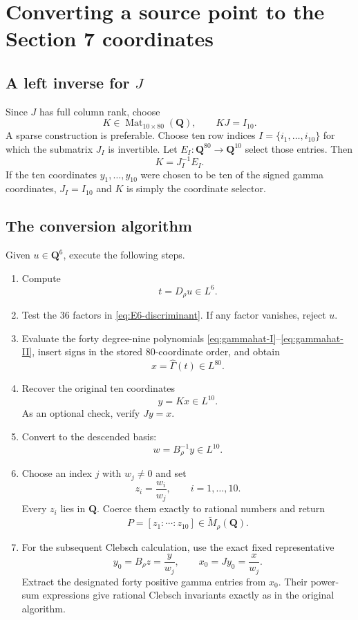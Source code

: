 \documentclass[11pt]{article}
\newcommand{\QQ}{\mathbf{Q}}
\newcommand{\Mat}{\operatorname{Mat}}
\newcommand{\tM}{\widetilde{M}}
\newcommand{\Gamhat}{\widehat{\Gamma}}
\begin{document}
\section{Converting a source point to the Section 7 coordinates}
\label{sec:coordinate-conversion}

\subsection{A left inverse for $J$}

Since $J$ has full column rank, choose
\[
  K\in\Mat_{10\times80}(\QQ),\qquad KJ=I_{10}.
\]
A sparse construction is preferable.  Choose ten row indices
$I=\{i_1,\ldots,i_{10}\}$ for which the submatrix $J_I$ is invertible.  Let
$E_I:\QQ^{80}\to\QQ^{10}$ select those entries.  Then
\[
  K=J_I^{-1}E_I.
\]
If the ten coordinates $y_1,\ldots,y_{10}$ were chosen to be ten of the signed gamma
coordinates, $J_I=I_{10}$ and $K$ is simply the coordinate selector.

\subsection{The conversion algorithm}

Given $u\in\QQ^6$, execute the following steps.

\begin{enumerate}[label=\textbf{P\arabic*.}]
\item Compute
\[
  t=D_\rho u\in L^6.
\]

\item Test the $36$ factors in \eqref{eq:E6-discriminant}.  If any factor vanishes,
reject $u$.

\item Evaluate the forty degree-nine polynomials
\eqref{eq:gammahat-I}--\eqref{eq:gammahat-II}, insert signs in the stored
$80$-coordinate order, and obtain
\[
  x=\Gamhat(t)\in L^{80}.
\]

\item Recover the original ten coordinates
\[
  y=Kx\in L^{10}.
\]
As an optional check, verify $Jy=x$.

\item Convert to the descended basis:
\[
  w=B_\rho^{-1}y\in L^{10}.
\]

\item Choose an index $j$ with $w_j\neq0$ and set
\begin{equation}
  z_i=\frac{w_i}{w_j},\qquad i=1,\ldots,10.
  \label{eq:rational-ratios}
\end{equation}
Every $z_i$ lies in $\QQ$.  Coerce them exactly to rational numbers and return
\[
  P=[z_1:\cdots:z_{10}]\in\tM_\rho(\QQ).
\]

\item For the subsequent Clebsch calculation, use the exact fixed representative
\[
  y_0=B_\rho z=\frac{y}{w_j},
  \qquad
  x_0=Jy_0=\frac{x}{w_j}.
\]
Extract the designated forty positive gamma entries from $x_0$.  Their power-sum
expressions give rational Clebsch invariants exactly as in the original algorithm.
\end{enumerate}
\end{document}
